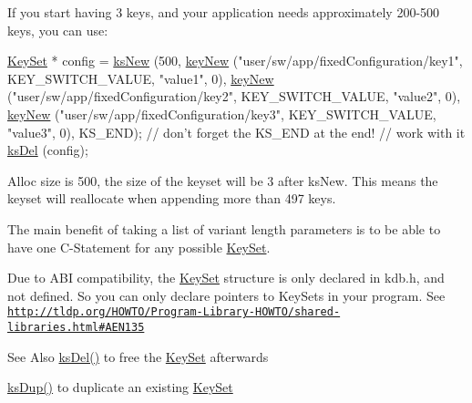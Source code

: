 If you start having 3 keys, and your application needs approximately 200-\/500 keys, you can use\-: 
\begin{DoxyCode}
\hyperlink{classkdb_1_1KeySet_a4eac9850fa4f06c07a5306befc3e4377}{KeySet} * config = \hyperlink{group__keyset_ga671e1aaee3ae9dc13b4834a4ddbd2c3c}{ksNew} (500,
        \hyperlink{group__key_gad23c65b44bf48d773759e1f9a4d43b89}{keyNew} (\textcolor{stringliteral}{"user/sw/app/fixedConfiguration/key1"}, KEY\_SWITCH\_VALUE, \textcolor{stringliteral}{
      "value1"}, 0),
        \hyperlink{group__key_gad23c65b44bf48d773759e1f9a4d43b89}{keyNew} (\textcolor{stringliteral}{"user/sw/app/fixedConfiguration/key2"}, KEY\_SWITCH\_VALUE, \textcolor{stringliteral}{
      "value2"}, 0),
        \hyperlink{group__key_gad23c65b44bf48d773759e1f9a4d43b89}{keyNew} (\textcolor{stringliteral}{"user/sw/app/fixedConfiguration/key3"}, KEY\_SWITCH\_VALUE, \textcolor{stringliteral}{
      "value3"}, 0),
        KS\_END); \textcolor{comment}{// don't forget the KS\_END at the end!}
\textcolor{comment}{// work with it}
\hyperlink{group__keyset_ga27e5c16473b02a422238c8d970db7ac8}{ksDel} (config);
\end{DoxyCode}
 Alloc size is 500, the size of the keyset will be 3 after ks\-New. This means the keyset will reallocate when appending more than 497 keys.

The main benefit of taking a list of variant length parameters is to be able to have one C-\/\-Statement for any possible \hyperlink{classkdb_1_1KeySet}{Key\-Set}.

Due to A\-B\-I compatibility, the {\ttfamily \hyperlink{classkdb_1_1KeySet}{Key\-Set}} structure is only declared in kdb.\-h, and not defined. So you can only declare {\ttfamily pointers} to {\ttfamily Key\-Sets} in your program. See \href{http://tldp.org/HOWTO/Program-Library-HOWTO/shared-libraries.html#AEN135}{\tt http\-://tldp.\-org/\-H\-O\-W\-T\-O/\-Program-\/\-Library-\/\-H\-O\-W\-T\-O/shared-\/libraries.\-html\#\-A\-E\-N135}

\begin{DoxySeeAlso}{See Also}
\hyperlink{group__keyset_ga27e5c16473b02a422238c8d970db7ac8}{ks\-Del()} to free the \hyperlink{group__keyset}{Key\-Set} afterwards 

\hyperlink{group__keyset_gac59e4b328245463f1451f68d5106151c}{ks\-Dup()} to duplicate an existing \hyperlink{group__keyset}{Key\-Set} 
\end{DoxySeeAlso}

